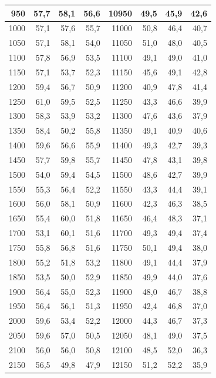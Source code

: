 \begin{small}
\begin{longtable}{|r|r|r|r|r|r|r|r|}
950 & 57,7 & 58,1 & 56,6 & 10950 & 49,5 & 45,9 & 42,6 \\ \hline
1000 & 57,1 & 57,6 & 55,7 & 11000 & 50,8 & 46,4 & 40,7 \\ \hline
1050 & 57,1 & 58,1 & 54,0 & 11050 & 51,0 & 48,0 & 40,5 \\ \hline
1100 & 57,8 & 56,9 & 53,5 & 11100 & 49,1 & 49,0 & 41,0 \\ \hline
1150 & 57,1 & 53,7 & 52,3 & 11150 & 45,6 & 49,1 & 42,8 \\ \hline
1200 & 59,4 & 56,7 & 50,9 & 11200 & 40,9 & 47,8 & 41,4 \\ \hline
1250 & 61,0 & 59,5 & 52,5 & 11250 & 43,3 & 46,6 & 39,9 \\ \hline
1300 & 58,3 & 53,9 & 53,2 & 11300 & 47,6 & 43,6 & 37,9 \\ \hline
1350 & 58,4 & 50,2 & 55,8 & 11350 & 49,1 & 40,9 & 40,6 \\ \hline
1400 & 59,6 & 56,6 & 55,9 & 11400 & 49,3 & 42,7 & 39,3 \\ \hline
1450 & 57,7 & 59,8 & 55,7 & 11450 & 47,8 & 43,1 & 39,8 \\ \hline
1500 & 54,0 & 59,4 & 54,5 & 11500 & 48,6 & 42,7 & 39,9 \\ \hline
1550 & 55,3 & 56,4 & 52,2 & 11550 & 43,3 & 44,4 & 39,1 \\ \hline
1600 & 56,0 & 58,1 & 50,9 & 11600 & 42,3 & 46,3 & 38,5 \\ \hline
1650 & 55,4 & 60,0 & 51,8 & 11650 & 46,4 & 48,3 & 37,1 \\ \hline
1700 & 53,1 & 60,1 & 51,6 & 11700 & 49,3 & 49,4 & 37,4 \\ \hline
1750 & 55,8 & 56,8 & 51,6 & 11750 & 50,1 & 49,4 & 38,0 \\ \hline
1800 & 55,2 & 51,8 & 53,2 & 11800 & 49,1 & 44,4 & 37,9 \\ \hline
1850 & 53,5 & 50,0 & 52,9 & 11850 & 49,9 & 44,0 & 37,6 \\ \hline
1900 & 56,4 & 55,0 & 52,3 & 11900 & 48,0 & 46,7 & 38,8 \\ \hline
1950 & 56,4 & 56,1 & 51,3 & 11950 & 42,4 & 46,8 & 37,0 \\ \hline
2000 & 59,6 & 53,4 & 52,2 & 12000 & 44,3 & 46,7 & 37,3 \\ \hline
2050 & 59,6 & 57,0 & 50,5 & 12050 & 48,1 & 49,0 & 37,5 \\ \hline
2100 & 56,0 & 56,0 & 50,8 & 12100 & 48,5 & 52,0 & 36,3 \\ \hline
2150 & 56,5 & 49,8 & 47,9 & 12150 & 51,2 & 52,2 & 35,9 \\ \hline

\end{longtable}
\end{small}
